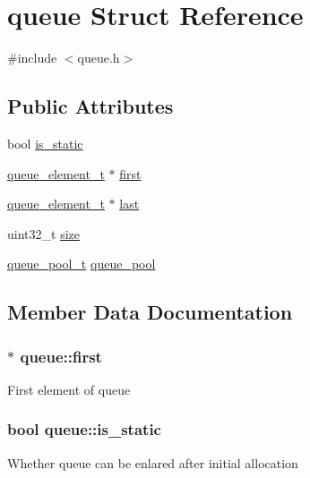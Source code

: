 \hypertarget{structqueue}{}\section{queue Struct Reference}
\label{structqueue}


{\ttfamily \#include $<$queue.\+h$>$}

\subsection*{Public Attributes}
\begin{DoxyCompactItemize}
\item 
bool \hyperlink{structqueue_a451013adf785137faeda072e597d8096}{is\+\_\+static}
\item 
\hyperlink{queue_8h_a518d6a11a5588433b3b1bd1303df78ad}{queue\+\_\+element\+\_\+t} $\ast$ \hyperlink{structqueue_a7af5c1b6d369952b6c27d0bfdc1b8319}{first}
\item 
\hyperlink{queue_8h_a518d6a11a5588433b3b1bd1303df78ad}{queue\+\_\+element\+\_\+t} $\ast$ \hyperlink{structqueue_aae654629b98bc351a1d413d33d8bd73d}{last}
\item 
uint32\+\_\+t \hyperlink{structqueue_a10ade3b6049d30b7c2ace7e0a6e12a4d}{size}
\item 
\hyperlink{queue_8h_afc621ef1f4f6cf985c1e83a4c67b2dfd}{queue\+\_\+pool\+\_\+t} \hyperlink{structqueue_a89eaf220ffbbf852f27514573277da75}{queue\+\_\+pool}
\end{DoxyCompactItemize}


\subsection{Member Data Documentation}
\hypertarget{structqueue_a7af5c1b6d369952b6c27d0bfdc1b8319}{}
\subsubsection[{first}]{$\ast$ queue\+::first}\label{structqueue_a7af5c1b6d369952b6c27d0bfdc1b8319}
First element of queue \hypertarget{structqueue_a451013adf785137faeda072e597d8096}{}
\subsubsection[{is\+\_\+static}]{\setlength{\rightskip}{0pt plus 5cm}bool queue\+::is\+\_\+static}\label{structqueue_a451013adf785137faeda072e597d8096}
Whether queue can be enlared after initial allocation \hypertarget{structqueue_aae654629b98bc351a1d413d33d8bd73d}{}

